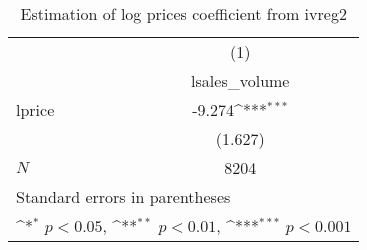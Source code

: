 \begin{table}[htbp]\centering
\def\sym#1{\ifmmode^{#1}\else\(^{#1}\)\fi}
\caption{Estimation of log prices coefficient from ivreg2}
\begin{tabular}{l*{1}{c}}
\hline\hline
            &\multicolumn{1}{c}{(1)}\\
            &\multicolumn{1}{c}{lsales\_volume}\\
\hline
lprice      &      -9.274\sym{***}\\
            &     (1.627)         \\
\hline
\(N\)       &        8204         \\
\hline\hline
\multicolumn{2}{l}{\footnotesize Standard errors in parentheses}\\
\multicolumn{2}{l}{\footnotesize \sym{*} \(p<0.05\), \sym{**} \(p<0.01\), \sym{***} \(p<0.001\)}\\
\end{tabular}
\end{table}
